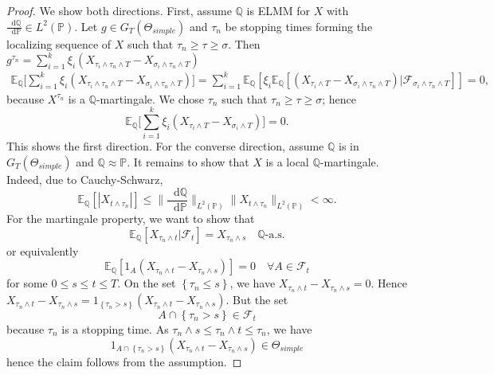 \documentclass[11pt,a4paper,twoside,openany]{report}
\newcommand{\diff}{\mathop{}\!\mathrm{d}}
\theoremstyle{plain} %
\theoremstyle{definition} %
\theoremstyle{remark} %
\begin{document}
\begin{proof}
    We show both directions. First, assume \(\mathbb{Q}\) is ELMM for \(X\) with \(\frac{\diff \mathbb{Q}}{\diff \mathbb{P}}\in L^2(\mathbb{P})\). 
    Let \(g\in G_T(\Theta_{simple})\) and \(\tau_n\) be stopping times forming the localizing sequence of \(X\) such that \(\tau_n\geq\tau\geq\sigma\). Then \(g^{\tau_n}=\sum_{i=1}^k\xi_i(X_{\tau_i\wedge\tau_n\wedge T}-X_{\sigma_i\wedge\tau_n\wedge T})\)
    \begin{align}
        \mathbb{E}_\mathbb{Q}\bigg[\sum_{i=1}^k\xi_i(X_{\tau_i\wedge\tau_n\wedge T}-X_{\sigma_i\wedge\tau_n\wedge T})\bigg]=\sum_{i=1}^k\mathbb{E}_\mathbb{Q}[\xi_i\mathbb{E}_\mathbb{Q}[(X_{\tau_i\wedge T}-X_{\sigma_i\wedge\tau_n\wedge T})|\mathcal{F}_{\sigma_i\wedge\tau_n\wedge T}]]=0,
    \end{align}
    because \(X^{\tau_n}\) is a \(\mathbb{Q}\)-martingale. We chose \(\tau_n\) such that \(\tau_n\geq\tau\geq\sigma\); hence
    \begin{equation}
        \mathbb{E}_\mathbb{Q}\bigg[\sum_{i=1}^k\xi_i(X_{\tau_i\wedge T}-X_{\sigma_i\wedge T})\bigg]=0.
    \end{equation}
    This shows the first direction. For the converse direction, assume \(\mathbb{Q}\) is in \(G_T(\Theta_{simple})\) and \(\mathbb{Q}\approx \mathbb{P}\). It remains to show that \(X\) is a local \(\mathbb{Q}\)-martingale. Indeed, due to Cauchy-Schwarz,
    \begin{equation}
        \mathbb{E}_\mathbb{Q}[|X_{t\wedge\tau_n}|]\leq\lVert\frac{\diff \mathbb{Q}}{\diff \mathbb{P}}\rVert_{L^2(\mathbb{P})}\lVert X_{t\wedge\tau_n}\rVert_{L^2(\mathbb{P})}<\infty.
    \end{equation}
    For the martingale property, we want to show that 
    \begin{equation}
        \mathbb{E}_\mathbb{Q}[X_{\tau_n\wedge t}|\mathcal{F}_t]=X_{\tau_n\wedge s}\quad \mathbb{Q}\text{-a.s.}
    \end{equation}
    or equivalently 
    \begin{equation}
        \mathbb{E}_\mathbb{Q}[1_A(X_{\tau_n\wedge t}-X_{\tau_n\wedge s})]=0\quad \forall A\in\mathcal{F}_t
    \end{equation}
    for some \(0\leq s\leq t\leq T\).
    On the set \(\left\{\tau_n\leq s\right\}\), we have \(X_{\tau_n\wedge t}-X_{\tau_n\wedge s}=0\). Hence \(X_{\tau_n\wedge t}-X_{\tau_n\wedge s}=1_{\left\{\tau_n>s\right\}}(X_{\tau_n\wedge t}-X_{\tau_n\wedge s})\). But the set
    \begin{equation}
        A\cap\left\{\tau_n>s\right\}\in\mathcal{F}_t
    \end{equation}
    because \(\tau_n\) is a stopping time. As \(\tau_n\wedge s\leq\tau_n\wedge t\leq \tau_n\), we have 
    \begin{equation}
        1_{A\cap\left\{\tau_n>s\right\}}(X_{\tau_n\wedge t}-X_{\tau_n\wedge s})\in\Theta_{simple}
    \end{equation}
    hence the claim follows from the assumption.
    \end{proof}
\end{document}

